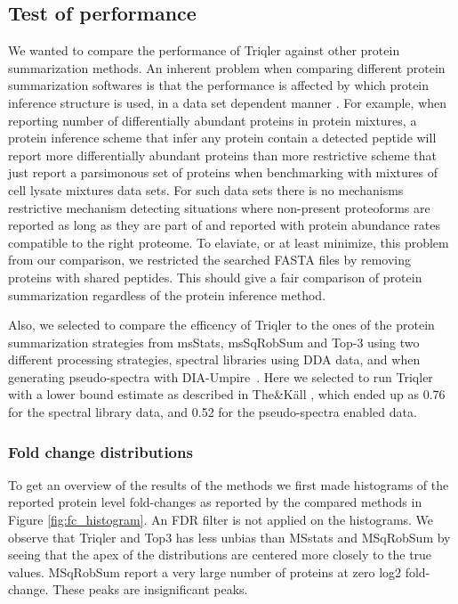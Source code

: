 \documentclass[10pt,letterpaper]{article}
\begin{document}
\subsection*{Test of performance}

We wanted to compare the performance of Triqler against other protein summarization methods. An inherent problem when comparing different protein summarization softwares is that the performance is affected by which protein inference structure is used, in a data set dependent manner \cite{serang2012recognizing}. For example, when reporting number of differentially abundant proteins in protein mixtures, a protein inference scheme that infer any protein contain  a detected peptide will report more differentially abundant proteins than more restrictive scheme that just report a parsimonous set of proteins when benchmarking with mixtures of cell lysate mixtures data sets.  For such data sets there is no mechanisms restrictive mechanism detecting situations where non-present proteoforms are reported as long as they are part of and reported with protein abundance rates compatible to the right proteome. To elaviate, or at least minimize, this problem from our comparison, we restricted the searched FASTA files by removing proteins with shared peptides. This should give a fair comparison of protein summarization regardless of the protein inference method.

Also, we selected to compare the efficency of Triqler to the ones of the protein summarization strategies from msStats, msSqRobSum and Top-3 using two different processing strategies, spectral libraries using DDA data, and when generating pseudo-spectra with DIA-Umpire~\cite{tsou2015dia}. Here we selected to run Triqler with a lower bound estimate as described in The\&K\"{a}ll \cite{the2021triqler}, which ended up as 0.76 for the spectral library data, and 0.52 for the pseudo-spectra enabled data.

\subsubsection*{Fold change distributions}

To get an overview of the results of the methods we first made histograms of the reported protein level fold-changes as reported by the compared methods in Figure \ref{fig:fc_histogram}. An FDR filter is not applied on the histograms. We observe that Triqler and Top3 has less unbias than MSstats and MSqRobSum by seeing that the apex of the distributions are centered more closely to the true values. MSqRobSum report a very large number of proteins at zero log2 fold-change. These peaks are insignificant peaks. 
\end{document}
